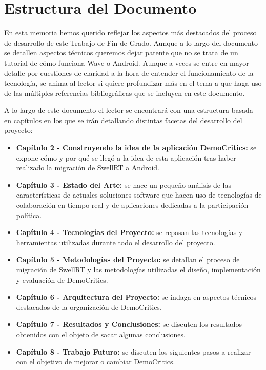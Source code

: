 \section{Estructura del Documento}

En esta memoria hemos querido reflejar los aspectos más destacados del proceso de desarrollo de este Trabajo de Fin de Grado. Aunque a lo largo del documento se detallen aspectos técnicos queremos dejar patente que no se trata de un tutorial de cómo funciona Wave o Android. Aunque a veces se entre en mayor detalle por cuestiones de claridad a la hora de entender el funcionamiento de la tecnología, se anima al lector si quiere profundizar más en el tema a que haga uso de las múltiples referencias bibliográficas que se incluyen en este documento.  

A lo largo de este documento el lector se encontrará con una estructura basada en capítulos en los que se irán detallando distintas facetas del desarrollo del proyecto: 

\begin{itemize}
  \item \textbf{Capítulo 2 - Construyendo la idea de la aplicación DemoCritics:} se expone cómo y por qué se llegó a la idea de esta aplicación tras haber realizado la migración de SwellRT a Android.
  \item \textbf{Capítulo 3 - Estado del Arte:} se hace un pequeño análisis de las características de actuales soluciones software que hacen uso de tecnologías de colaboración en tiempo real y de aplicaciones dedicadas a la participación política.
  \item \textbf{Capítulo 4 - Tecnologías del Proyecto:} se repasan las tecnologías y herramientas utilizadas durante todo el desarrollo del proyecto.
  \item \textbf{Capítulo 5 - Metodologías del Proyecto:} se detallan el proceso de migración de SwellRT y las metodologías utilizadas el diseño, implementación y evaluación de DemoCritics.
  \item \textbf{Capítulo 6 - Arquitectura del Proyecto:} se indaga en aspectos técnicos destacados de la organización de DemoCritics.
  \item \textbf{Capítulo 7 - Resultados y Conclusiones:} se discuten los resultados obtenidos con el objeto de sacar algunas conclusiones.
  \item \textbf{Capítulo 8 - Trabajo Futuro:} se discuten los siguientes pasos a realizar con el objetivo  de mejorar o cambiar DemoCritics.
\end{itemize}
